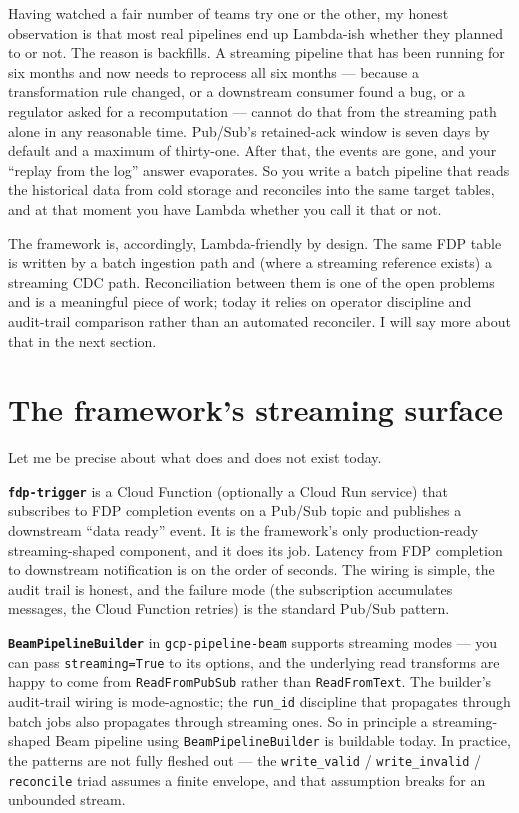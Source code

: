 \documentclass[
  11pt,
  british,
  oneside]{book}
\begin{document}
Having watched a fair number of teams try one or the other, my honest
observation is that most real pipelines end up Lambda-ish whether they
planned to or not. The reason is backfills. A streaming pipeline that
has been running for six months and now needs to reprocess all six
months --- because a transformation rule changed, or a downstream
consumer found a bug, or a regulator asked for a recomputation ---
cannot do that from the streaming path alone in any reasonable time.
Pub/Sub's retained-ack window is seven days by default and a maximum of
thirty-one. After that, the events are gone, and your ``replay from the
log'' answer evaporates. So you write a batch pipeline that reads the
historical data from cold storage and reconciles into the same target
tables, and at that moment you have Lambda whether you call it that or
not.

The framework is, accordingly, Lambda-friendly by design. The same FDP
table is written by a batch ingestion path and (where a streaming
reference exists) a streaming CDC path. Reconciliation between them is
one of the open problems and is a meaningful piece of work; today it
relies on operator discipline and audit-trail comparison rather than an
automated reconciler. I will say more about that in the next section.

\hypertarget{the-frameworks-streaming-surface}{%
\section{The framework's streaming
surface}\label{the-frameworks-streaming-surface}}

Let me be precise about what does and does not exist today.

\textbf{\texttt{fdp-trigger}} is a Cloud Function
(optionally a Cloud Run service) that subscribes to FDP completion
events on a Pub/Sub topic and publishes a downstream ``data ready''
event. It is the framework's only production-ready streaming-shaped
component, and it does its job. Latency from FDP completion to
downstream notification is on the order of seconds. The wiring is
simple, the audit trail is honest, and the failure mode (the
subscription accumulates messages, the Cloud Function retries) is the
standard Pub/Sub pattern.

\textbf{\texttt{BeamPipelineBuilder}} in \texttt{gcp-pipeline-beam}
supports streaming modes --- you can pass \texttt{streaming=True} to its
options, and the underlying read transforms are happy to come from
\texttt{ReadFromPubSub} rather than \texttt{ReadFromText}. The builder's
audit-trail wiring is mode-agnostic; the \texttt{run\_id} discipline
that propagates through batch jobs also propagates through streaming
ones. So in principle a streaming-shaped Beam pipeline using
\texttt{BeamPipelineBuilder} is buildable today. In practice, the
patterns are not fully fleshed out --- the \texttt{write\_valid} /
\texttt{write\_invalid} / \texttt{reconcile} triad assumes a finite
envelope, and that assumption breaks for an unbounded stream.
\end{document}
